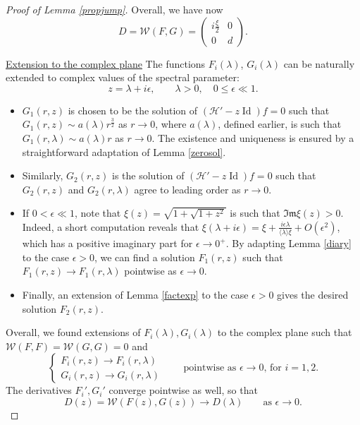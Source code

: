 \documentclass[11 pt]{amsart}
\theoremstyle{definition}
\theoremstyle{remark}
\numberwithin{equation}{section}
\begin{document}
\begin{proof}[Proof of Lemma \ref{propjump}]
Overall, we have now
\begin{equation}
\label{formulaDlambda}
D = \mathcal{W}(F,G) = \begin{pmatrix} i \frac{\xi}{2} & 0 \\ 0 & d \end{pmatrix}. 
\end{equation}

\bigskip

\noindent \underline{Extension to the complex plane} The functions $F_i(\lambda)$, $G_i(\lambda)$ can be naturally extended to complex values of the spectral parameter: 
$$
z = \lambda + i \epsilon, \qquad \lambda>0, \quad 0 \leq \epsilon \ll 1.
$$ 

\begin{itemize}
\item $G_1(r,z)$ is chosen to be the solution of $(\mathcal{H}' - z \operatorname{Id}) f =0$ such that $G_1(r,z) \sim a(\lambda) r^{\frac{3}{2}}$ as $r \to 0$, where $a(\lambda)$, defined earlier, is such that $G_1(r,\lambda) \sim a(\lambda) r$ as $r\to 0$.  The existence and uniqueness is ensured by a straightforward adaptation of Lemma \ref{zerosol}.
\item Similarly, $G_2(r,z)$ is the solution of $(\mathcal{H}' - z \operatorname{Id}) f =0$ such that $G_2(r,z)$ and $G_2(r,\lambda)$ agree to leading order as $r \to 0$.
\item If $0 < \epsilon \ll 1$, note that $\xi(z) = \sqrt{1+\sqrt{1+z^2}}$ is such that $\mathfrak{Im} \xi(z) > 0$. Indeed, a short computation reveals that $\xi(\lambda+i\epsilon) = \xi+ \frac{i \epsilon \lambda}{\langle \lambda \rangle \xi}+O(\epsilon^2)$, which has a positive imaginary part for $\epsilon \to 0^+$. By adapting Lemma \ref{diary} to the case $\epsilon>0$, we can find a solution $F_1(r,z)$ such that $F_1(r,z) \to F_1(r,\lambda)$ pointwise as $\epsilon \to 0$.
\item Finally, an extension of Lemma \ref{factexp} to the case $\epsilon >0$ gives the desired solution $F_2(r,z)$.
\end{itemize}
Overall, we found extensions of $F_i(\lambda),G_i(\lambda)$ to the complex plane such that $\mathcal{W}(F,F) = \mathcal{W}(G,G) = 0$ and
$$
\begin{cases}
F_i(r,z) \to F_i(r,\lambda) \\
G_i(r,z) \to G_i(r,\lambda) 
\end{cases}
\qquad \mbox{pointwise as $\epsilon \to 0$, for $i=1,2$}.
$$
The derivatives $F_i',G_i'$ converge pointwise as well, so that
$$
D(z) = \mathcal{W}(F(z),G(z)) \to D(\lambda) \qquad \mbox{as $\epsilon \to 0$.}
$$


\end{proof}
\end{document}

